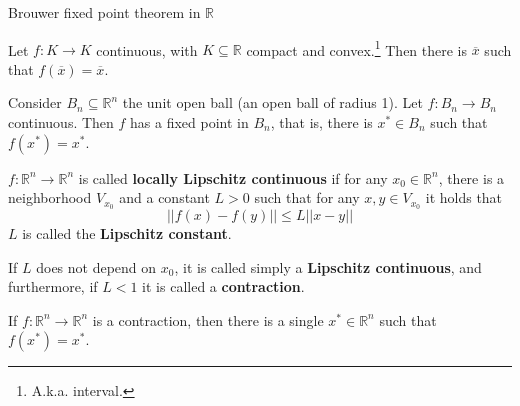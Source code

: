 \documentclass[aspectratio=169]{beamer}
\begin{document}
\begin{frame}{Brouwer fixed point theorem in $\mathds{R}$}

    \begin{theorem}
    Let $f:K\rightarrow K$ continuous, with $K\subseteq\mathds{R}$ compact and convex.\footnote{A.k.a. interval.} Then there is $\overline{x}$ such that $f(\overline{x})=\overline{x}$.
    \end{theorem}
\end{frame}

\begin{frame}
    \begin{theorem}
        Consider $B_n\subseteq\mathds{R}^n$ the unit open ball (an open ball of radius 1). Let $f:B_n\rightarrow B_n$ continuous. Then $f$ has a fixed point in $B_n$, that is, there is $x^*\in B_n$ such that $f(x^*)=x^*$.
    \end{theorem}
    
\end{frame}


\begin{frame}
    \begin{definition}
        $f:\mathds{R}^n\rightarrow\mathds{R}^n$ is called \textbf{locally Lipschitz continuous} if for any $x_0\in\mathds{R}^n$, there is a neighborhood $V_{x_0}$ and a constant $L>0$ such that for any $x,y\in V_{x_0}$ it holds that $$||f(x)-f(y)||\leq L ||x-y||$$ $L$ is called the \textbf{Lipschitz constant}.
        
        If $L$ does not depend on $x_0$, it is called simply a \textbf{Lipschitz continuous}, and furthermore, if $L<1$ it is called a \textbf{contraction}.
    \end{definition}
\end{frame}

\begin{frame}
\begin{theorem}
    If $f:\mathds{R}^n\rightarrow\mathds{R}^n$ is a contraction, then there is a single $x^*\in\mathds{R}^n$ such that $f(x^*)=x^*$.
\end{theorem}
\end{frame}
\end{document}
